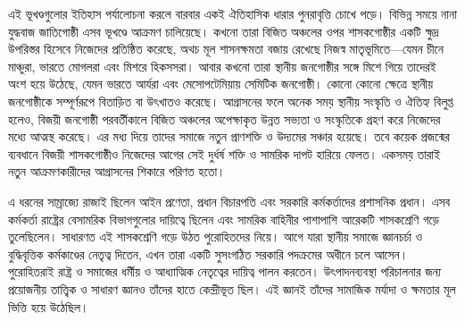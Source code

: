 এই ভূখণ্ডগুলোর ইতিহাস পর্যালোচনা করলে বারবার একই ঐতিহাসিক ধারার পুনরাবৃত্তি চোখে পড়ে। বিভিন্ন সময়ে নানা যুদ্ধবাজ জাতিগোষ্ঠী এসব ভূখণ্ডে আক্রমণ চালিয়েছে। কখনো তারা বিজিত অঞ্চলের ওপর শাসকগোষ্ঠীর একটি ক্ষুদ্র উপরিস্তর হিসেবে নিজেদের প্রতিষ্ঠিত করেছে, অথচ মূল শাসনক্ষমতা বজায় রেখেছে নিজস্ব মাতৃভূমিতে—যেমন চীনে মাঞ্চুরা, ভারতে মোগলরা এবং মিশরে হিকসসরা। আবার কখনো তারা স্থানীয় জনগোষ্ঠীর সঙ্গে মিশে গিয়ে তাদেরই অংশ হয়ে উঠেছে, যেমন ভারতে আর্যরা এবং মেসোপটেমিয়ায় সেমিটিক জনগোষ্ঠী। কোনো কোনো ক্ষেত্রে স্থানীয় জনগোষ্ঠীকে সম্পূর্ণরূপে বিতাড়িত বা উৎখাতও করেছে।
আগ্রাসনের ফলে অনেক সময় স্থানীয় সংস্কৃতি ও ঐতিহ্য বিলুপ্ত হলেও, বিজয়ী জনগোষ্ঠী পরবর্তীকালে বিজিত অঞ্চলের অপেক্ষাকৃত উন্নত সভ্যতা ও সংস্কৃতিকে গ্রহণ করে নিজেদের মধ্যে আত্মস্থ করেছে। এর মধ্য দিয়ে তাদের সমাজে নতুন প্রাণশক্তি ও উদ্যমের সঞ্চার হয়েছে। তবে কয়েক প্রজন্মের ব্যবধানে বিজয়ী শাসকগোষ্ঠীও নিজেদের আগের সেই দুর্ধর্ষ শক্তি ও সামরিক দাপট হারিয়ে ফেলত। একসময় তারাই নতুন আক্রমণকারীদের আগ্রাসনের শিকারে পরিণত হতো।



এ ধরনের সাম্রাজ্যে রাজাই ছিলেন আইন প্রণেতা, প্রধান বিচারপতি এবং সরকারি কর্মকর্তাদের প্রশাসনিক প্রধান। এসব কর্মকর্তা রাষ্ট্রের বেসামরিক বিভাগগুলোর দায়িত্বে ছিলেন এবং সামরিক বাহিনীর পাশাপাশি আরেকটি শাসকশ্রেণি গড়ে তুলেছিলেন।
সাধারণত এই শাসকশ্রেণি গড়ে উঠত পুরোহিতদের নিয়ে। আগে যারা স্থানীয় সমাজে জ্ঞানচর্চা ও বুদ্ধিবৃত্তিক কর্মকাণ্ডের নেতৃত্ব দিতেন, এখন তারা একটি সুসংগঠিত সরকারি পদক্রমের অধীনে চলে আসেন।
পুরোহিতরাই রাষ্ট্র ও সমাজের ধর্মীয় ও আধ্যাত্মিক নেতৃত্বের দায়িত্ব পালন করতেন। উৎপাদনব্যবস্থা পরিচালনার জন্য প্রয়োজনীয় তাত্ত্বিক ও সাধারণ জ্ঞানও তাঁদের হাতে কেন্দ্রীভূত ছিল। এই জ্ঞানই তাঁদের সামাজিক মর্যাদা ও ক্ষমতার মূল ভিত্তি হয়ে উঠেছিল।

